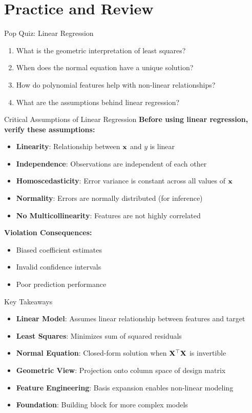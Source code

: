 \documentclass{beamer}
\begin{document}
\section{Practice and Review}

\begin{frame}{Pop Quiz: Linear Regression}
\begin{enumerate}[<+->]
\item What is the geometric interpretation of least squares?
\item When does the normal equation have a unique solution?
\item How do polynomial features help with non-linear relationships?
\item What are the assumptions behind linear regression?
\end{enumerate}
\end{frame}

\begin{frame}{Critical Assumptions of Linear Regression}
\textbf{Before using linear regression, verify these assumptions:}
\begin{itemize}[<+->]
\item \textbf{Linearity}: Relationship between $\mathbf{x}$ and $y$ is linear
\item \textbf{Independence}: Observations are independent of each other
\item \textbf{Homoscedasticity}: Error variance is constant across all values of $\mathbf{x}$
\item \textbf{Normality}: Errors are normally distributed (for inference)
\item \textbf{No Multicollinearity}: Features are not highly correlated
\end{itemize}

\pause
\textbf{Violation Consequences:}
\begin{itemize}[<+->]
\item Biased coefficient estimates
\item Invalid confidence intervals
\item Poor prediction performance
\end{itemize}
\end{frame}

\begin{frame}{Key Takeaways}
\begin{itemize}[<+->]
\item \textbf{Linear Model}: Assumes linear relationship between features and target
\item \textbf{Least Squares}: Minimizes sum of squared residuals
\item \textbf{Normal Equation}: Closed-form solution when $\mathbf{X}^\top\mathbf{X}$ is invertible
\item \textbf{Geometric View}: Projection onto column space of design matrix
\item \textbf{Feature Engineering}: Basis expansion enables non-linear modeling
\item \textbf{Foundation}: Building block for more complex models
\end{itemize}
\end{frame}
\end{document}

